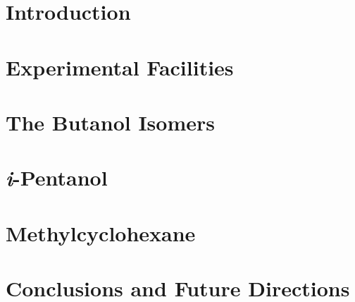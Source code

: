 \documentclass[12pt,letterpaper,oneside,final,openany]{book}
\begin{document}
\cleardoublepage
\setcounter{page}{1}

\chapter{Introduction}
\label{chap:intro}

\cleardoublepage

\chapter{Experimental Facilities}
\label{chap:facilities}

\cleardoublepage

\chapter{The Butanol Isomers}
\label{chap:buoh}

\cleardoublepage

\chapter{\textit{i}-Pentanol}
\label{chap:peoh}

\cleardoublepage

\chapter{Methylcyclohexane}
\label{chap:mch}

\cleardoublepage

\chapter{Conclusions and Future Directions}
\label{chap:conclusions}

\cleardoublepage

\printbibliography[heading=bibintoc]
\end{document}
